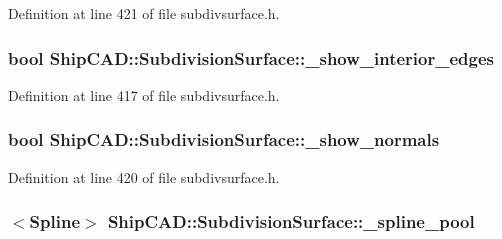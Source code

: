 Definition at line 421 of file subdivsurface.\+h.

\subsubsection[{\texorpdfstring{\+\_\+show\+\_\+interior\+\_\+edges}{_show_interior_edges}}]{\setlength{\rightskip}{0pt plus 5cm}bool Ship\+C\+A\+D\+::\+Subdivision\+Surface\+::\+\_\+show\+\_\+interior\+\_\+edges\hspace{0.3cm}{\ttfamily [protected]}}\hypertarget{classShipCAD_1_1SubdivisionSurface_a4458d02152bd97495938586c89e6d9e2}{}\label{classShipCAD_1_1SubdivisionSurface_a4458d02152bd97495938586c89e6d9e2}


Definition at line 417 of file subdivsurface.\+h.

\subsubsection[{\texorpdfstring{\+\_\+show\+\_\+normals}{_show_normals}}]{\setlength{\rightskip}{0pt plus 5cm}bool Ship\+C\+A\+D\+::\+Subdivision\+Surface\+::\+\_\+show\+\_\+normals\hspace{0.3cm}{\ttfamily [protected]}}\hypertarget{classShipCAD_1_1SubdivisionSurface_a0cc840743e7afcd136ab864ace158a17}{}\label{classShipCAD_1_1SubdivisionSurface_a0cc840743e7afcd136ab864ace158a17}


Definition at line 420 of file subdivsurface.\+h.

\subsubsection[{\texorpdfstring{\+\_\+spline\+\_\+pool}{_spline_pool}}]{$<${\bf Spline}$>$ Ship\+C\+A\+D\+::\+Subdivision\+Surface\+::\+\_\+spline\+\_\+pool\hspace{0.3cm}{\ttfamily [protected]}}\hypertarget{classShipCAD_1_1SubdivisionSurface_acfa427b1b9a8582382fcb2a7de95553f}{}\label{classShipCAD_1_1SubdivisionSurface_acfa427b1b9a8582382fcb2a7de95553f}


